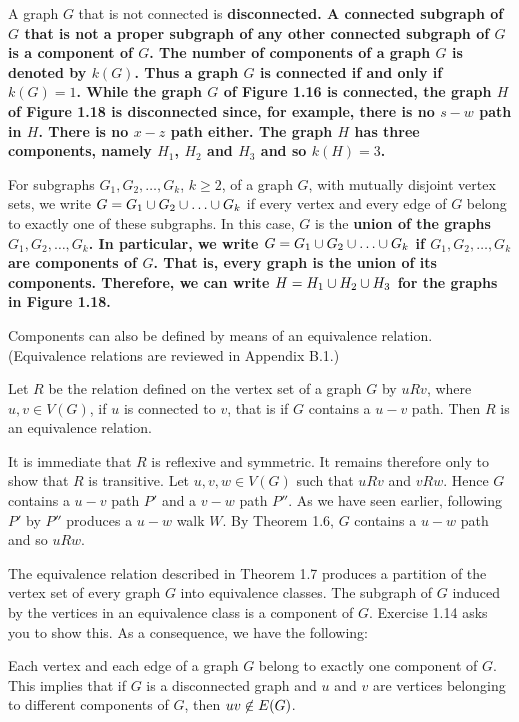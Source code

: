 A graph $G$ that is not connected is \bf{disconnected}. A connected subgraph of $G$ that is not a proper subgraph of any other connected subgraph of $G$ is a \bf{component} of $G$. The number of components of a graph $G$ is denoted by $k(G)$. Thus a graph $G$ is connected if and only if $k(G) = 1$. While the graph $G$ of Figure 1.16 is connected, the graph $H$ of Figure 1.18 is disconnected since, for example, there is no $s-w$ path in $H$. There is no $x-z$ path either. The graph $H$ has three components, namely $H_{1}$, $H_{2}$ and $H_{3}$ and so $k(H) = 3$.

For subgraphs $G_{1},G_{2},\ldots,G_{k}$, $k \geq 2$, of a graph $G$, with mutually disjoint vertex sets, we write $G = G_{1} \cup G_{2} \cup \ldots \cup G_{k}$ if every vertex and every edge of $G$ belong to exactly one of these subgraphs. In this case, $G$ is the \bf{union} of the graphs $G_{1},G_{2},\ldots,G_{k}$. In particular, we write $G = G_{1} \cup G_{2} \cup \ldots \cup G_{k}$ if $G_{1},G_{2},\ldots,G_{k}$ are components of $G$. That is, every graph is the union of its components. Therefore, we can write $H = H_{1} \cup H_{2} \cup H_{3}$ for the graphs in Figure 1.18.



Components can also be defined by means of an equivalence relation. (Equivalence relations are reviewed in Appendix B.1.)

\begin{thm}
Let $R$ be the relation defined on the vertex set of a graph $G$ by $u R v$, where $u,v \in V(G)$, if $u$ is connected to $v$, that is if $G$ contains a $u-v$ path. Then $R$ is an equivalence relation.
\end{thm}

\begin{pf}
It is immediate that $R$ is reflexive and symmetric. It remains therefore only to show that $R$ is transitive. Let $u,v,w \in V(G)$ such that $u R v$ and $v R w$. Hence $G$ contains a $u-v$ path $P'$ and a $v-w$ path $P''$. As we have seen earlier, following $P'$ by $P''$ produces a $u-w$ walk $W$. By Theorem 1.6, $G$ contains a $u-w$ path and so $u R w$.
\end{pf}

The equivalence relation described in Theorem 1.7 produces a partition of the vertex set of every graph $G$ into equivalence classes. The subgraph of $G$ induced by the vertices in an equivalence class is a component of $G$. Exercise 1.14 asks you to show this. As a consequence, we have the following:
\begin{cons}
Each vertex and each edge of a graph $G$ belong to exactly one component of $G$. This implies that if $G$ is a disconnected graph and $u$ and $v$ are vertices belonging to different components of $G$, then $uv \centernot\in E(G)$.
\end{cons}

